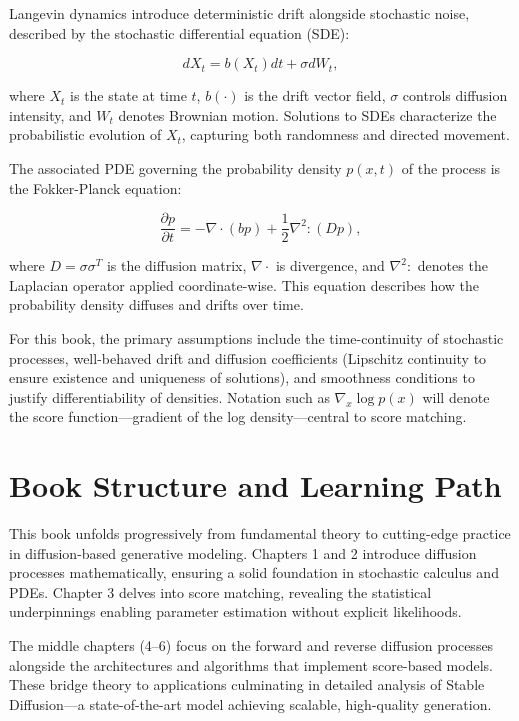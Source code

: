 Langevin dynamics introduce deterministic drift alongside stochastic noise, described by the stochastic differential equation (SDE):

\[
dX_t = b(X_t) dt + \sigma dW_t,
\]

where \( X_t \) is the state at time \( t \), \( b(\cdot) \) is the drift vector field, \( \sigma \) controls diffusion intensity, and \( W_t \) denotes Brownian motion. Solutions to SDEs characterize the probabilistic evolution of \( X_t \), capturing both randomness and directed movement.

The associated PDE governing the probability density \( p(x,t) \) of the process is the Fokker-Planck equation:

\[
\frac{\partial p}{\partial t} = -\nabla \cdot (b p) + \frac{1}{2} \nabla^2 : (D p),
\]

where \( D = \sigma \sigma^T \) is the diffusion matrix, \( \nabla \cdot \) is divergence, and \( \nabla^2 : \) denotes the Laplacian operator applied coordinate-wise. This equation describes how the probability density diffuses and drifts over time.

For this book, the primary assumptions include the time-continuity of stochastic processes, well-behaved drift and diffusion coefficients (Lipschitz continuity to ensure existence and uniqueness of solutions), and smoothness conditions to justify differentiability of densities. Notation such as \( \nabla_x \log p(x) \) will denote the score function—gradient of the log density—central to score matching.

\section{Book Structure and Learning Path}

This book unfolds progressively from fundamental theory to cutting-edge practice in diffusion-based generative modeling. Chapters 1 and 2 introduce diffusion processes mathematically, ensuring a solid foundation in stochastic calculus and PDEs. Chapter 3 delves into score matching, revealing the statistical underpinnings enabling parameter estimation without explicit likelihoods.

The middle chapters (4–6) focus on the forward and reverse diffusion processes alongside the architectures and algorithms that implement score-based models. These bridge theory to applications culminating in detailed analysis of Stable Diffusion—a state-of-the-art model achieving scalable, high-quality generation.

